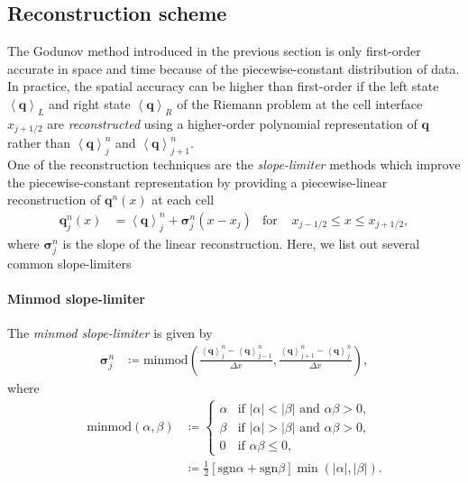 \subsection{Reconstruction scheme}
The Godunov method introduced in the previous section is only first-order accurate in space and time
because of the piecewise-constant distribution of data.
In practice, the spatial accuracy can be higher than first-order 
if the left state $\left\langle \mathbf{q} \right\rangle_{L}$ 
and right state $\left\langle \mathbf{q} \right\rangle_{R}$ of the Riemann problem
at the cell interface $x_{j+1/2}$
are \textit{reconstructed} using a higher-order polynomial representation of $\mathbf{q}$
rather than $\left\langle \mathbf{q} \right\rangle^n_j$ and $\left\langle \mathbf{q} \right\rangle^n_{j+1}$.\\
One of the reconstruction techniques are the \textit{slope-limiter} methods 
which improve the piecewise-constant representation by providing a piecewise-linear reconstruction
of $\mathbf{q}^n(x)$ at each cell
\begin{align}
    \mathbf{q}^n_j (x) &= \left\langle \mathbf{q} \right\rangle^n_j + \mathbf{\sigma}^n_j \left(x-x_j \right) &
    \text{for } & x_{j-1/2} \leq x \leq x_{j+1/2},
\end{align}
where $\mathbf{\sigma}^n_j$ is the slope of the linear reconstruction.
Here, we list out several common slope-limiters
\paragraph{Minmod slope-limiter}
The \textit{minmod slope-limiter} \cite{ziegler2011semi,kolgan1972application,van1979towards}
is given by
\begin{align}
    \mathbf{\sigma}^n_j &\coloneqq \text{minmod}\left(
    \frac{\left\langle \mathbf{q} \right\rangle^n_j-\left\langle \mathbf{q} \right\rangle^n_{j-1}}{\Delta x},
    \frac{\left\langle \mathbf{q} \right\rangle^n_{j+1}-\left\langle \mathbf{q} \right\rangle^n_{j}}{\Delta x} \right),
\end{align}
where
\begin{align}
    \text{minmod}\left(\alpha, \beta \right) &\coloneqq
    \begin{cases}
        \alpha & \text{if } |\alpha|<|\beta| \text{ and } \alpha\beta>0, \\
        \beta & \text{if } |\alpha|>|\beta| \text{ and } \alpha\beta>0, \\
        0 & \text{if } \alpha\beta \leq 0,
    \end{cases}\\
    &\coloneqq \frac{1}{2}\left[ \text{sgn}{\alpha} + \text{sgn}{\beta} \right] \min \left(|\alpha|,|\beta| \right).
\end{align}

